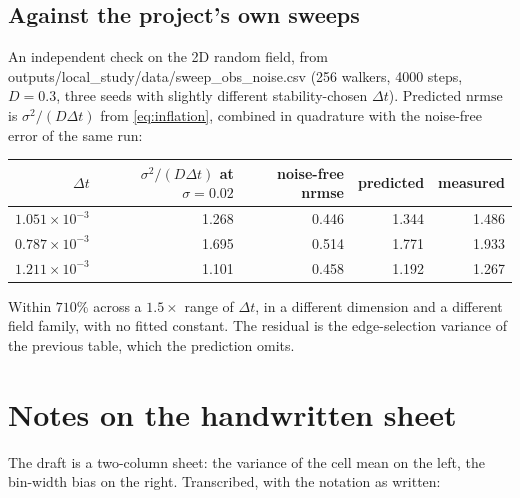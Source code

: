 \documentclass[11pt,a4paper]{article}
\newcommand{\code}[1]{{\ttfamily\small #1}}
\newcommand{\dt}{\Delta t}
\begin{document}
\subsection{Against the project's own sweeps}

An independent check on the 2D random field, from
\code{outputs/local\_study/data/sweep\_obs\_noise.csv} (256 walkers, 4000 steps,
$D=0.3$, three seeds with slightly different stability-chosen $\dt$). Predicted
$\mathrm{nrmse}$ is $\sigma^{2}/(D\dt)$ from \eqref{eq:inflation}, combined in
quadrature with the noise-free error of the same run:

\begin{center}
\small
\begin{tabular}{@{}rrrrr@{}}
\toprule
$\dt$ & $\sigma^{2}/(D\dt)$ at $\sigma=0.02$ & noise-free nrmse & predicted & measured \\
\midrule
$1.051\times10^{-3}$ & 1.268 & 0.446 & 1.344 & 1.486 \\
$0.787\times10^{-3}$ & 1.695 & 0.514 & 1.771 & 1.933 \\
$1.211\times10^{-3}$ & 1.101 & 0.458 & 1.192 & 1.267 \\
\bottomrule
\end{tabular}
\end{center}

Within $7$\textendash$10\%$ across a $1.5\times$ range of $\dt$, in a different
dimension and a different field family, with no fitted constant. The residual is the
edge-selection variance of the previous table, which the prediction omits.

\clearpage
\section{Notes on the handwritten sheet}

The draft is a two-column sheet: the variance of the cell mean on the left, the bin-width
bias on the right. Transcribed, with the notation as written:
\end{document}
